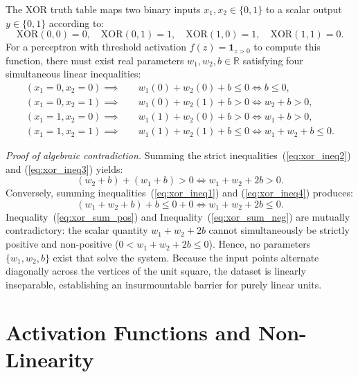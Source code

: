 \documentclass[../../../main.tex]{subfiles}
\begin{document}
The XOR truth table maps two binary inputs $x_1, x_2 \in \{0, 1\}$ to a scalar output $y \in \{0, 1\}$ according to:
\begin{equation}
\text{XOR}(0, 0) = 0, \quad \text{XOR}(0, 1) = 1, \quad \text{XOR}(1, 0) = 1, \quad \text{XOR}(1, 1) = 0.
\end{equation}
For a perceptron with threshold activation $f(z) = \mathbf{1}_{z > 0}$ to compute this function, there must exist real parameters $w_1, w_2, b \in \mathbb{R}$ satisfying four simultaneous linear inequalities:
\begin{align}
(x_1 = 0, x_2 = 0) \implies & \quad w_1(0) + w_2(0) + b \le 0 \iff b \le 0, \label{eq:xor_ineq1} \\
(x_1 = 0, x_2 = 1) \implies & \quad w_1(0) + w_2(1) + b > 0 \iff w_2 + b > 0, \label{eq:xor_ineq2} \\
(x_1 = 1, x_2 = 0) \implies & \quad w_1(1) + w_2(0) + b > 0 \iff w_1 + b > 0, \label{eq:xor_ineq3} \\
(x_1 = 1, x_2 = 1) \implies & \quad w_1(1) + w_2(1) + b \le 0 \iff w_1 + w_2 + b \le 0. \label{eq:xor_ineq4}
\end{align}

\textit{Proof of algebraic contradiction.} Summing the strict inequalities~(\ref{eq:xor_ineq2}) and (\ref{eq:xor_ineq3}) yields:
\begin{equation}
(w_2 + b) + (w_1 + b) > 0 \iff w_1 + w_2 + 2b > 0.
\label{eq:xor_sum_pos}
\end{equation}
Conversely, summing inequalities~(\ref{eq:xor_ineq1}) and (\ref{eq:xor_ineq4}) produces:
\begin{equation}
(w_1 + w_2 + b) + b \le 0 + 0 \iff w_1 + w_2 + 2b \le 0.
\label{eq:xor_sum_neg}
\end{equation}
Inequality~(\ref{eq:xor_sum_pos}) and Inequality~(\ref{eq:xor_sum_neg}) are mutually contradictory: the scalar quantity $w_1 + w_2 + 2b$ cannot simultaneously be strictly positive and non-positive ($0 < w_1 + w_2 + 2b \le 0$). Hence, no parameters $\{w_1, w_2, b\}$ exist that solve the system. Because the input points alternate diagonally across the vertices of the unit square, the dataset is linearly inseparable, establishing an insurmountable barrier for purely linear units.

\clearpage
\section{Activation Functions and Non-Linearity}
\label{sec:non_linearity_activations}
\end{document}
